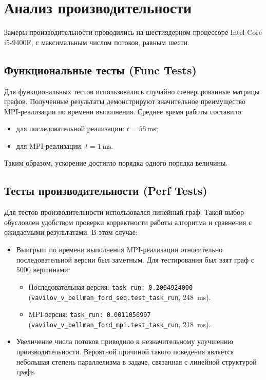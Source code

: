 \documentclass[12pt]{article}
\begin{document}
\section{Анализ производительности}

Замеры производительности проводились на шестиядерном процессоре Intel Core i5-9400F, с максимальным числом потоков, равным шести. 

\subsection{Функциональные тесты (Func Tests)}

Для функциональных тестов использовались случайно сгенерированные матрицы графов. Полученные результаты демонстрируют значительное преимущество MPI-реализации по времени выполнения. Среднее время работы составило:
\begin{itemize}
    \item для последовательной реализации: \(t = 55 \, \text{ms}\);
    \item для MPI-реализации: \(t = 1 \, \text{ms}\).
\end{itemize}
Таким образом, ускорение достигло порядка одного порядка величины.

\subsection{Тесты производительности (Perf Tests)}

Для тестов производительности использовался линейный граф. Такой выбор обусловлен удобством проверки корректности работы алгоритма и сравнения с ожидаемыми результатами. В этом случае:

\begin{itemize}
    \item Выигрыш по времени выполнения MPI-реализации относительно последовательной версии был заметным. 
    Для тестирования был взят граф с 5000 вершинами:
    \begin{itemize}
        \item Последовательная версия: \texttt{task\_run: 0.2064924000}\\ (\texttt{vavilov\_v\_bellman\_ford\_seq.test\_task\_run}, 248~ms).
        \item MPI-версия: \texttt{task\_run: 0.0011056997}\\ (\texttt{vavilov\_v\_bellman\_ford\_mpi.test\_task\_run}, 218~ms).
    \end{itemize}
    \item Увеличение числа потоков приводило к незначительному улучшению производительности. Вероятной причиной такого поведения является небольшая степень параллелизма в задаче, связанная с линейной структурой графа.
\end{itemize}
\end{document}
